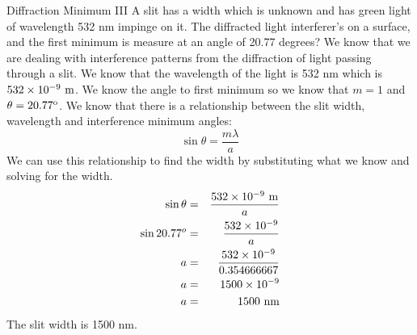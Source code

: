 \begin{wex}{Diffraction Minimum III}
{A slit has a width which is unknown and has green light of wavelength 532 nm impinge on it. The diffracted light interferer's on a surface, and the first minimum is measure at an angle of 20.77 degrees? }
{
We know that we are dealing with interference patterns from the diffraction of light passing through a slit. We know that the wavelength of the light is 532 nm which is $532 \times 10^{-9}\ \rm{m}$. We know the angle to first minimum so we know that $m=1$ and $\theta = 20.77^{\rm{o}}$.
We know that there is a relationship between the slit width, wavelength and interference minimum angles:
\begin{equation*}
\sin\theta = \frac{m\lambda}{a}
\end{equation*}
We can use this relationship to find the width by substituting what we know and solving for the width.
\begin{eqnarray*}
\sin\theta &=& \frac{532\times 10^{-9} \ \rm{m}}{a} \\
\sin 20.77^{o} &=& \frac{532\times 10^{-9}}{a} \\
a &=& \frac{532\times 10^{-9}}{0.354666667}  \\
a & = & 1500 \times 10^{-9} \\
a & = & 1500\  \rm{nm} \\
\end{eqnarray*}
The slit width is 1500 nm.
}
\end{wex}






